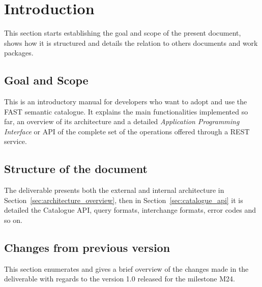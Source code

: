 \documentclass{fast_latex}
\begin{document}
\clearpage
\section{Introduction} %
\label{sec:introduction}
This section starts establishing the goal and scope of the present document, shows how it is structured and details the relation to others documents and work packages.

\subsection{Goal and Scope} %
\label{sub:goal_and_scope}

This is an introductory manual for developers who want to adopt and use the FAST semantic catalogue. It explains the main functionalities implemented so far, an overview of its architecture and a detailed \emph{Application Programming Interface} or API of the complete set of the operations offered through a REST service.


\subsection{Structure of the document} %
\label{sub:structure_of_the_document}

The deliverable presents both the external and internal architecture in Section~\ref{sec:architecture_overview}, then in Section~\ref{sec:catalogue_api} it is detailed the Catalogue API, query formats, interchange formats, error codes and so on.


\subsection{Changes from previous version} %
\label{sub:changes_from_previous_version}

This section enumerates and gives a brief overview of the changes made in the deliverable with regards to the version 1.0 released for the milestone M24.
\end{document}
